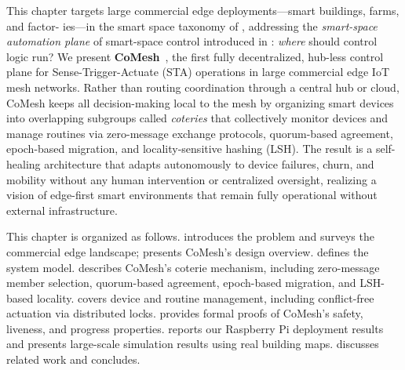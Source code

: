 This chapter targets large commercial edge deployments---smart buildings, farms, and factor- ies---in the smart space taxonomy of , addressing the \emph{smart-space automation plane} of smart-space control introduced in : \emph{where} should control logic run? We present \textbf{CoMesh}~\cite{comesh}, the first fully decentralized, hub-less control plane for Sense-Trigger-Actuate (STA) operations in large commercial edge IoT mesh networks. Rather than routing coordination through a central hub or cloud, CoMesh keeps all decision-making local to the mesh by organizing smart devices into overlapping subgroups called \emph{coteries} that collectively monitor devices and manage routines via zero-message exchange protocols, quorum-based agreement, epoch-based migration, and locality-sensitive hashing (LSH). The result is a self-healing architecture that adapts autonomously to device failures, churn, and mobility without any human intervention or centralized oversight, realizing a vision of edge-first smart environments that remain fully operational without external infrastructure.

This chapter is organized as follows.  introduces the problem and surveys the commercial edge landscape;  presents CoMesh's design overview.  defines the system model.  describes CoMesh's coterie mechanism, including zero-message member selection, quorum-based agreement, epoch-based migration, and LSH-based locality.  covers device and routine management, including conflict-free actuation via distributed locks.  provides formal proofs of CoMesh's safety, liveness, and progress properties.  reports our Raspberry Pi deployment results and  presents large-scale simulation results using real building maps.  discusses related work and  concludes.
